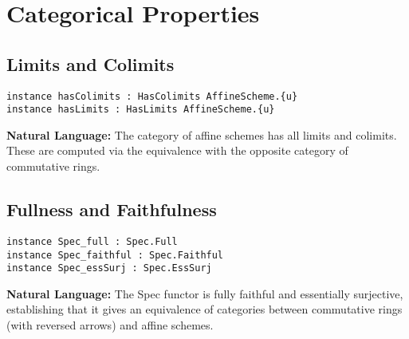\documentclass{article}
\theoremstyle{definition}
\begin{document}
\section{Categorical Properties}

\subsection{Limits and Colimits}

\begin{lstlisting}
instance hasColimits : HasColimits AffineScheme.{u}
instance hasLimits : HasLimits AffineScheme.{u}
\end{lstlisting}

\textbf{Natural Language:} The category of affine schemes has all limits and colimits. These are computed via the equivalence with the opposite category of commutative rings.

\subsection{Fullness and Faithfulness}

\begin{lstlisting}
instance Spec_full : Spec.Full
instance Spec_faithful : Spec.Faithful
instance Spec_essSurj : Spec.EssSurj
\end{lstlisting}

\textbf{Natural Language:} The Spec functor is fully faithful and essentially surjective, establishing that it gives an equivalence of categories between commutative rings (with reversed arrows) and affine schemes.
\end{document}

